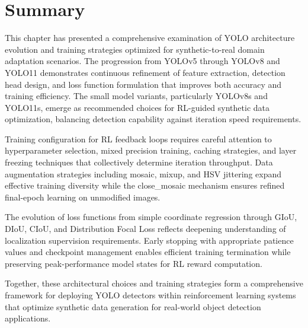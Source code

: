 \section{Summary}

This chapter has presented a comprehensive examination of YOLO architecture evolution and training strategies optimized for synthetic-to-real domain adaptation scenarios. The progression from YOLOv5 through YOLOv8 and YOLO11 demonstrates continuous refinement of feature extraction, detection head design, and loss function formulation that improves both accuracy and training efficiency. The small model variants, particularly YOLOv8s and YOLO11s, emerge as recommended choices for RL-guided synthetic data optimization, balancing detection capability against iteration speed requirements.

Training configuration for RL feedback loops requires careful attention to hyperparameter selection, mixed precision training, caching strategies, and layer freezing techniques that collectively determine iteration throughput. Data augmentation strategies including mosaic, mixup, and HSV jittering expand effective training diversity while the close\_mosaic mechanism ensures refined final-epoch learning on unmodified images.

The evolution of loss functions from simple coordinate regression through GIoU, DIoU, CIoU, and Distribution Focal Loss reflects deepening understanding of localization supervision requirements. Early stopping with appropriate patience values and checkpoint management enables efficient training termination while preserving peak-performance model states for RL reward computation.

Together, these architectural choices and training strategies form a comprehensive framework for deploying YOLO detectors within reinforcement learning systems that optimize synthetic data generation for real-world object detection applications.
